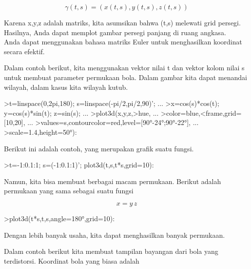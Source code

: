 \documentclass{article}
\begin{document}
\begin{eulernotebook}
\begin{eulercomment}
\end{eulercomment}
\begin{eulerformula}
\[
\gamma(t,s) = (x(t,s),y(t,s),z(t,s))
\]
\end{eulerformula}
\begin{eulercomment}
Karena x,y,z adalah matriks, kita asumsikan bahwa (t,s) melewati grid
persegi. Hasilnya, Anda dapat memplot gambar persegi panjang di ruang
angkasa.\\
Anda dapat menggunakan bahasa matriks Euler untuk menghasilkan
koordinat secara efektif.

Dalam contoh berikut, kita menggunakan vektor nilai t dan vektor kolom
nilai s untuk membuat parameter permukaan bola. Dalam gambar kita
dapat menandai wilayah, dalam kasus kita wilayah kutub.
\end{eulercomment}
\begin{eulerprompt}
>t=linspace(0,2pi,180); s=linspace(-pi/2,pi/2,90)'; ...
>x=cos(s)*cos(t); y=cos(s)*sin(t); z=sin(s); ...
>plot3d(x,y,z,>hue, ...
>color=blue,<frame,grid=[10,20], ...
>values=s,contourcolor=red,level=[90°-24°;90°-22°], ...
>scale=1.4,height=50°):
\end{eulerprompt}
\begin{eulercomment}
Berikut ini adalah contoh, yang merupakan grafik suatu fungsi.
\end{eulercomment}
\begin{eulerprompt}
>t=-1:0.1:1; s=(-1:0.1:1)'; plot3d(t,s,t*s,grid=10):
\end{eulerprompt}
\begin{eulercomment}
Namun, kita bisa membuat berbagai macam permukaan. Berikut adalah
permukaan yang sama sebagai suatu fungsi

\end{eulercomment}
\begin{eulerformula}
\[
x = y \, z
\]
\end{eulerformula}
\begin{eulerprompt}
>plot3d(t*s,t,s,angle=180°,grid=10):
\end{eulerprompt}
\begin{eulercomment}
Dengan lebih banyak usaha, kita dapat menghasilkan banyak permukaan.

Dalam contoh berikut kita membuat tampilan bayangan dari bola yang
terdistorsi. Koordinat bola yang biasa adalah


\end{eulercomment}
\end{eulernotebook}
\end{document}
